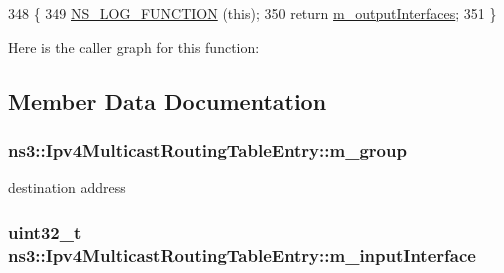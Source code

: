 \begin{DoxyCode}
348 \{
349   \hyperlink{log-macros-disabled_8h_a90b90d5bad1f39cb1b64923ea94c0761}{NS\_LOG\_FUNCTION} (\textcolor{keyword}{this});
350   \textcolor{keywordflow}{return} \hyperlink{classns3_1_1Ipv4MulticastRoutingTableEntry_a69118bb9f1092643d77e4326d3de0721}{m\_outputInterfaces};
351 \}
\end{DoxyCode}


Here is the caller graph for this function\+:




\subsection{Member Data Documentation}
\subsubsection[{\texorpdfstring{m\+\_\+group}{m_group}}]{ ns3\+::\+Ipv4\+Multicast\+Routing\+Table\+Entry\+::m\+\_\+group\hspace{0.3cm}{\ttfamily [private]}}\hypertarget{classns3_1_1Ipv4MulticastRoutingTableEntry_a789ff7205247eac010152736d0860496}{}\label{classns3_1_1Ipv4MulticastRoutingTableEntry_a789ff7205247eac010152736d0860496}


destination address 

\subsubsection[{\texorpdfstring{m\+\_\+input\+Interface}{m_inputInterface}}]{\setlength{\rightskip}{0pt plus 5cm}uint32\+\_\+t ns3\+::\+Ipv4\+Multicast\+Routing\+Table\+Entry\+::m\+\_\+input\+Interface\hspace{0.3cm}{\ttfamily [private]}}\hypertarget{classns3_1_1Ipv4MulticastRoutingTableEntry_af513439f1e8601fbe93541c2d70a5945}{}\label{classns3_1_1Ipv4MulticastRoutingTableEntry_af513439f1e8601fbe93541c2d70a5945}


